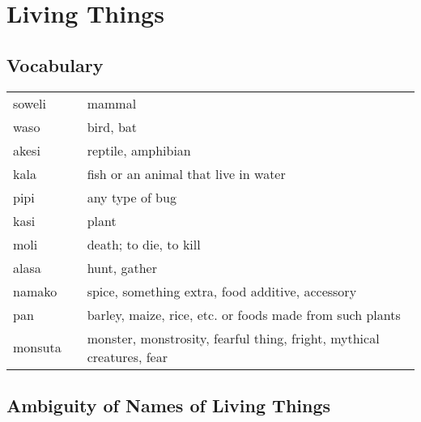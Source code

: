 \section{Living Things}
%
\subsection*{Vocabulary}
%
\begin{supertabular}{p{5,5cm}|ll}
soweli && mammal \\
waso && bird, bat \\
akesi && reptile, amphibian \\
kala && fish or an animal that live in water   \\     
pipi && any type of bug  \\
kasi && plant \\
moli && death; to die, to kill \\
alasa  && 	hunt, gather  \\
namako  && 	spice, something extra, food additive, accessory \\
pan    &&  barley, maize, rice, etc. or foods made from such plants \\
monsuta && monster, monstrosity, fearful thing, fright, mythical creatures, fear \\
\end{supertabular} 
%
\subsection*{Ambiguity of Names of Living Things}
